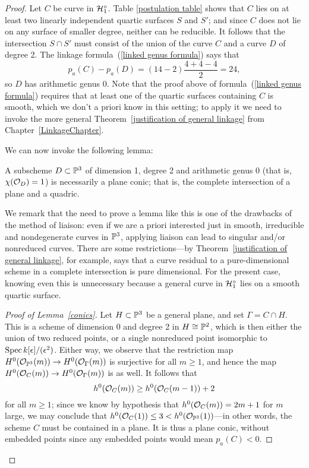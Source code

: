 \begin{proof}
  Let $C$ be curve in $\cH^\circ_1$. Table \ref{postulation table} shows that $C$ lies on at least two linearly independent quartic surfaces $S$ and $S'$; and since $C$ does not lie on any surface of smaller degree, neither can be reducible. It follows that the intersection $S \cap S'$ must consist of the union of the curve $C$ and a curve $D$ of degree 2. The linkage formula~(\ref{linked genus formula}) says that
$$
p_a(C) - p_{a}(D) = (14 - 2)\frac{4+4-4}{2} = 24,
$$
so $D$ has arithmetic genus 0. Note that the proof above of formula~(\ref{linked genus formula}) requires that at least one of the quartic surfaces containing $C$ is smooth, which we don't a priori know in this setting; to apply it we need to invoke the more general Theorem~\ref{justification of general linkage} from Chapter~\ref{LinkageChapter}.

We can now invoke the following lemma:

\begin{lemma}\label{conics}
A subscheme $D \subset \PP^3$ of dimension 1, degree 2 and arithmetic genus 0 (that is, $\chi(\cO_D) = 1$) is necessarily a plane conic; that is, the complete intersection of a plane and a quadric.
\end{lemma}

We remark that the need to prove a lemma like this is one of the drawbacks of the method of liaison: even if we are a priori interested just in smooth, irreducible and nondegenerate curves in $\PP^3$, applying liaison can lead to  singular and/or nonreduced curves. There are some restrictions---by Theorem~\ref{justification of general linkage}, for example, says that a curve residual to a pure-dimensional scheme in a complete intersection is pure dimensional. For the present case, knowing even this is unnecessary because  a general curve in $\cH^\circ_1$ lies on a smooth quartic surface.

\begin{proof}[Proof of Lemma~\ref{conics}]
Let $H \subset \PP^3$ be a general plane, and set $\Gamma = C \cap H$. This is a scheme of dimension 0 and degree 2 in $H \cong \PP^2$, which is then either the union of two reduced points, or a single nonreduced point isomorphic to $\Spec k[\epsilon]/(\epsilon^2)$. Either way, we observe that the restriction map $H^0(\cO_{\PP^3}(m)) \to H^0(\cO_{\Gamma}(m))$ is surjective for all $m \geq 1$, and hence the map $H^0(\cO_{C}(m)) \to H^0(\cO_{\Gamma}(m))$ is as well. It follows that
    $$
    h^0(\cO_C(m)) \geq h^0(\cO_C(m-1)) + 2
    $$
    for all $m \geq 1$; since we know by  hypothesis that $h^0(\cO_C(m)) = 2m+1$ for $m$ large, we may conclude that $h^0(\cO_C(1)) \leq 3 < h^0(\cO_{\PP^3}(1))$---in other words, the scheme $C$ must be contained in a plane. It is thus a plane conic, without embedded points since any embedded points would mean $p_a(C) < 0$.
\end{proof}


\end{proof}
